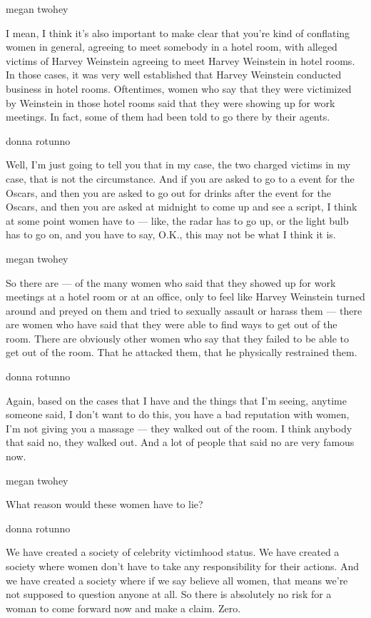 megan twohey

I mean, I think it's also important to make clear that you're kind of
conflating women in general, agreeing to meet somebody in a hotel room,
with alleged victims of Harvey Weinstein agreeing to meet Harvey
Weinstein in hotel rooms. In those cases, it was very well established
that Harvey Weinstein conducted business in hotel rooms. Oftentimes,
women who say that they were victimized by Weinstein in those hotel
rooms said that they were showing up for work meetings. In fact, some of
them had been told to go there by their agents.

donna rotunno

Well, I'm just going to tell you that in my case, the two charged
victims in my case, that is not the circumstance. And if you are asked
to go to a event for the Oscars, and then you are asked to go out for
drinks after the event for the Oscars, and then you are asked at
midnight to come up and see a script, I think at some point women have
to --- like, the radar has to go up, or the light bulb has to go on, and
you have to say, O.K., this may not be what I think it is.

megan twohey

So there are --- of the many women who said that they showed up for work
meetings at a hotel room or at an office, only to feel like Harvey
Weinstein turned around and preyed on them and tried to sexually assault
or harass them --- there are women who have said that they were able to
find ways to get out of the room. There are obviously other women who
say that they failed to be able to get out of the room. That he attacked
them, that he physically restrained them.

donna rotunno

Again, based on the cases that I have and the things that I'm seeing,
anytime someone said, I don't want to do this, you have a bad reputation
with women, I'm not giving you a massage --- they walked out of the
room. I think anybody that said no, they walked out. And a lot of people
that said no are very famous now.

megan twohey

What reason would these women have to lie?

donna rotunno

We have created a society of celebrity victimhood status. We have
created a society where women don't have to take any responsibility for
their actions. And we have created a society where if we say believe all
women, that means we're not supposed to question anyone at all. So there
is absolutely no risk for a woman to come forward now and make a claim.
Zero.

